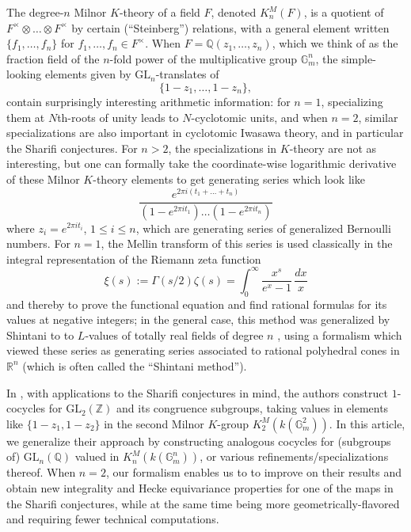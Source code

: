 \documentclass[10pt]{amsart}
\theoremstyle{definition}
\newcommand{\Q}{\mathbb{Q}}
\newcommand{\R}{\mathbb{R}}
\newcommand{\G}{\mathbb{G}}
\newcommand{\GL}{\mathrm{GL}}
\numberwithin{equation}{section}
\begin{document}
    The degree-$n$ Milnor $K$-theory of a field $F$, denoted $K_n^M(F)$, is a quotient of $F^\times \otimes \ldots \otimes F^\times$ by certain (``Steinberg'') relations, with a general element written $\{f_1,\ldots, f_n\}$ for $f_1,\ldots, f_n\in F^\times$. When $F=\Q(z_1,\ldots, z_n)$, which we think of as the fraction field of the $n$-fold power of the multiplicative group $\G_m^n$, the simple-looking elements given by $\GL_n$-translates of 
    \[
        \{1-z_1,\ldots, 1-z_n\},
    \]
    contain surprisingly interesting arithmetic information: for $n=1$, specializing them at $N$th-roots of unity leads to $N$-cyclotomic units, and when $n=2$, similar specializations are also important in cyclotomic Iwasawa theory, and in particular the Sharifi conjectures. For $n>2$, the specializations in $K$-theory are not as interesting, but one can formally take the coordinate-wise logarithmic derivative of these Milnor $K$-theory elements to get generating series which look like
    \[
    \frac{e^{2\pi i (t_1+\ldots + t_n)}}{(1-e^{2\pi i t_1})\ldots(1-e^{2\pi i t_n})}
    \]
    where $z_i=e^{2\pi i t_i}$, $1\le i \le n$, which are generating series of generalized Bernoulli numbers. For $n=1$, the Mellin transform of this series is used classically in the integral representation of the Riemann zeta function
    \[
    \xi(s):=\Gamma(s/2)\zeta(s) = \int_0^\infty \frac{x^{s}}{e^x-1}\,\frac{dx}{x}
    \]
    and thereby to prove the functional equation and find rational formulas for its values at negative integers; in the general case, this method was generalized by Shintani to to $L$-values of totally real fields of degree $n$ \cite{Shin}, using a formalism which viewed these series as generating series associated to rational polyhedral cones in $\R^n$ (which is often called the ``Shintani method'').
    
    In \cite{SV}, with applications to the Sharifi conjectures in mind, the authors construct $1$-cocycles for $\mathrm{GL}_2(\mathbb{Z})$ and its congruence subgroups, taking values in elements like $\{1-z_1,1-z_2\}$ in the second Milnor $K$-group $K_2^M(k(\mathbb{G}_m^2))$. In this article, we generalize their approach by constructing analogous cocycles for (subgroups of) $\mathrm{GL}_n(\mathbb{Q})$ valued in $K_n^M(k(\mathbb{G}_m^n))$, or various refinements/specializations thereof. When $n=2$, our formalism enables us to to improve on their results and obtain new integrality and Hecke equivariance properties for one of the maps in the Sharifi conjectures, while at the same time being more geometrically-flavored and requiring fewer technical computations.
    
\end{document}
